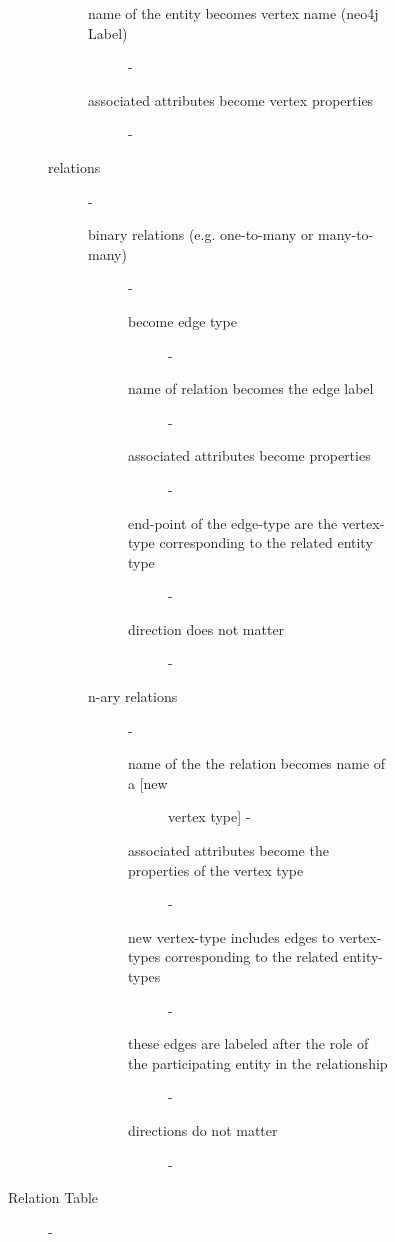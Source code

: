 \begin{description}
\begin{description}
\begin{description}
\begin{description}
\begin{description}
\begin{description}
            \item[name of the entity becomes vertex name (neo4j Label)] - 
            \item[associated attributes become vertex properties] - 
          \end{description} %
          \item[relations] - 
          \begin{description}
            \item[binary relations (e.g. one-to-many or many-to-many)] - 
            \begin{description}
              \item[become edge type] - 
              \item[name of relation becomes the edge label] - 
              \item[associated attributes become properties] - 
              \item[end-point of the edge-type are the vertex-type corresponding to the related entity type] - 
              \item[direction does not matter] - 
            \end{description} %
            \item[n-ary relations] - 
            \begin{description}
              \item[name of the the relation becomes name of a [new] vertex type] - 
              \item[associated attributes become the properties of the vertex type] - 
              \item[new vertex-type includes edges to vertex-types corresponding to the related entity-types] - 
              \item[these edges are labeled after the role of the participating entity in the relationship] - 
              \item[directions do not matter] - 
            \end{description} %
          \end{description} %
        \end{description} %
        \item[Relation Table] - 
      \end{description} %

\end{description}
\end{description}
\end{description}
